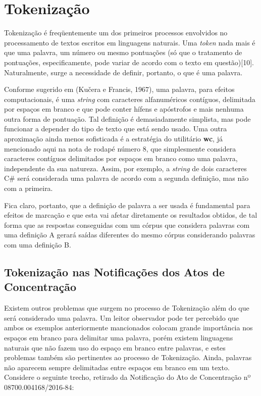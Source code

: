 \documentclass[11pt]{report}
\begin{document}
\section{Tokenização}

\indent\indent Tokenização é freqüentemente um dos primeiros processos envolvidos no processamento de textos escritos em linguagens naturais. Uma \textit{token} nada mais é que uma
palavra, um número ou mesmo pontuações (só que o tratamento de pontuações, especificamente, pode variar de acordo com o texto em questão)[10]. Naturalmente, surge a necessidade de
definir, portanto, o que é uma palavra.

Conforme sugerido em (Kučera e Francis, 1967), uma palavra, para efeitos computacionais, é uma \textit{string} com caracteres alfanuméricos
contíguos, delimitada por espaços em branco e que pode conter hífens e apóstrofos e mais nenhuma outra forma de pontuação. Tal definição é demasiadamente simplista,
mas pode funcionar a depender do tipo de texto que está sendo usado. Uma outra aproximação ainda menos sofisticada é a estratégia do utilitário \textbf{wc}, já mencionado
aqui na nota de rodapé número 8, que simplesmente considera caracteres contíguos delimitados por espaços em branco como uma palavra, independente da sua natureza. Assim, por exemplo,
a \textit{string} de dois caracteres C\# será considerada uma palavra de acordo com a segunda definição, mas não com a primeira.

Fica claro, portanto, que a definição de palavra a ser usada é fundamental para efeitos de marcação e que esta vai afetar diretamente os resultados obtidos, de tal forma que as
respostas conseguidas com um córpus que considera palavras com uma definição A gerará saídas diferentes do mesmo córpus considerando palavras com uma definição B.

\subsection{Tokenização nas Notificações dos Atos de Concentração}

\indent\indent Existem outros problemas que surgem no processo de Tokenização além do que será considerado uma palavra. Um leitor observador pode ter percebido que ambos os exemplos anteriormente
mancionados colocam grande importância nos espaços em branco para delimitar uma palavra, porém existem linguagens naturais que não fazem uso do espaço em branco entre palavras, e
estes problemas também são pertinentes ao processo de Tokenização. Ainda, palavras não aparecem sempre delimitadas entre espaços em branco em um texto. Considere o seguinte trecho,
retirado da Notificação do Ato de Concentração nº 08700.004168/2016-84:
\end{document}
